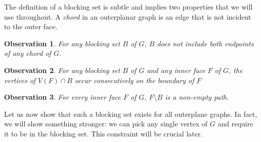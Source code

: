 \documentclass{patmorin}
\newtheorem{obs}{Observation}[theorem]
\begin{document}
The definition of a blocking set is subtle and implies two properties
that
 we will use throughout.
 A \emph{chord} in an outerplanar graph
is an edge that is not incident
 to the outer face.

\begin{obs}
   For any blocking set $B$ of $G$, $B$ does not include both endpoints
   of any chord of $G$.
\end{obs}

\begin{obs}
   For any blocking set $B$ of $G$ and any inner face $F$ of $G$, the
   vertices of $V(F)\cap B$ occur consecutively on the boundary of $F$ 
\end{obs}

\begin{obs}
  For every inner face $F$ of $G$, $F \setminus B$ is a non-empty path.
  \label{claim:facesMinusBarePaths}
\end{obs}
 


Let us now show that such a blocking set exists for all outerplane graphs. In fact, we will show something stronger:  we can pick any single vertex of $G$ and require it to be in the blocking set. This constraint will be crucial later.
\end{document}
